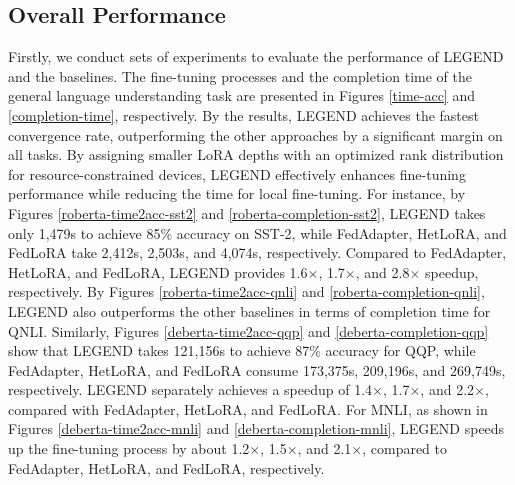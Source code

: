 \subsection{Overall Performance}
\vspace{-0.1cm}
Firstly, we conduct sets of experiments to evaluate the performance of LEGEND and the baselines.
The fine-tuning processes and the completion time of the general language understanding task are presented in Figures \ref{time-acc} and \ref{completion-time}, respectively.
By the results, LEGEND achieves the fastest convergence rate, outperforming the other approaches by a significant margin on all tasks. 
By assigning smaller LoRA depths with an optimized rank distribution for resource-constrained devices, LEGEND effectively enhances fine-tuning performance while reducing the time for local fine-tuning.
For instance, by Figures \ref{roberta-time2acc-sst2} and \ref{roberta-completion-sst2}, LEGEND takes only 1,479s to achieve 85\% accuracy on SST-2, while FedAdapter, HetLoRA, and FedLoRA take 2,412s, 2,503s, and 4,074s, respectively.
Compared to FedAdapter, HetLoRA, and FedLoRA, LEGEND provides 1.6$\times$, 1.7$\times$, and 2.8$\times$ speedup, respectively. 
By Figures \ref{roberta-time2acc-qnli} and \ref{roberta-completion-qnli}, LEGEND also outperforms the other baselines in terms of completion time for QNLI. 
Similarly, Figures \ref{deberta-time2acc-qqp} and \ref{deberta-completion-qqp} show that LEGEND takes 121,156s to achieve 87\% accuracy for QQP, while FedAdapter, HetLoRA, and FedLoRA consume 173,375s, 209,196s, and 269,749s, respectively. 
LEGEND separately achieves a speedup of 1.4$\times$, 1.7$\times$, and 2.2$\times$, compared with FedAdapter, HetLoRA, and FedLoRA.
For MNLI, as shown in Figures \ref{deberta-time2acc-mnli} and \ref{deberta-completion-mnli}, LEGEND speeds up the fine-tuning process by about 1.2$\times$, 1.5$\times$, and 2.1$\times$, compared to FedAdapter, HetLoRA, and FedLoRA, respectively. 
